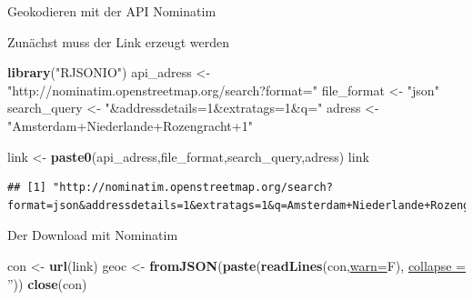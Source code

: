 \documentclass[ignorenonframetext,]{beamer}
\newenvironment{Shaded}{\begin{snugshade}}{\end{snugshade}}
\newcommand{\DataTypeTok}[1]{\textcolor[rgb]{0.74,0.68,0.62}{\underline{#1}}}
\newcommand{\KeywordTok}[1]{\textcolor[rgb]{0.26,0.66,0.93}{\textbf{#1}}}
\newcommand{\NormalTok}[1]{\textcolor[rgb]{0.74,0.68,0.62}{#1}}
\newcommand{\StringTok}[1]{\textcolor[rgb]{0.02,0.61,0.04}{#1}}
\begin{document}
\begin{frame}[fragile]{Geokodieren mit der API Nominatim}
\protect\hypertarget{geokodieren-mit-der-api-nominatim}{}

\begin{block}{Zunächst muss der Link erzeugt werden}

\begin{Shaded}
\begin{Highlighting}[]
\KeywordTok{library}\NormalTok{(}\StringTok{"RJSONIO"}\NormalTok{)}
\NormalTok{api_adress <-}\StringTok{ "http://nominatim.openstreetmap.org/search?format="}
\NormalTok{file_format <-}\StringTok{ "json"}
\NormalTok{search_query <-}\StringTok{ "&addressdetails=1&extratags=1&q="}
\NormalTok{adress <-}\StringTok{ "Amsterdam+Niederlande+Rozengracht+1"}

\NormalTok{link <-}\StringTok{ }\KeywordTok{paste0}\NormalTok{(api_adress,file_format,search_query,adress)}
\NormalTok{link}
\end{Highlighting}
\end{Shaded}

\begin{verbatim}
## [1] "http://nominatim.openstreetmap.org/search?format=json&addressdetails=1&extratags=1&q=Amsterdam+Niederlande+Rozengracht+1"
\end{verbatim}

\end{block}

\end{frame}

\begin{frame}[fragile]{Der Download mit Nominatim}
\protect\hypertarget{der-download-mit-nominatim}{}

\begin{Shaded}
\begin{Highlighting}[]
\NormalTok{con <-}\StringTok{ }\KeywordTok{url}\NormalTok{(link)}
\NormalTok{geoc <-}\StringTok{ }\KeywordTok{fromJSON}\NormalTok{(}\KeywordTok{paste}\NormalTok{(}\KeywordTok{readLines}\NormalTok{(con,}\DataTypeTok{warn=}\NormalTok{F), }
                       \DataTypeTok{collapse =} \StringTok{''}\NormalTok{))}
\KeywordTok{close}\NormalTok{(con)}
\end{Highlighting}
\end{Shaded}

\end{frame}
\end{document}
